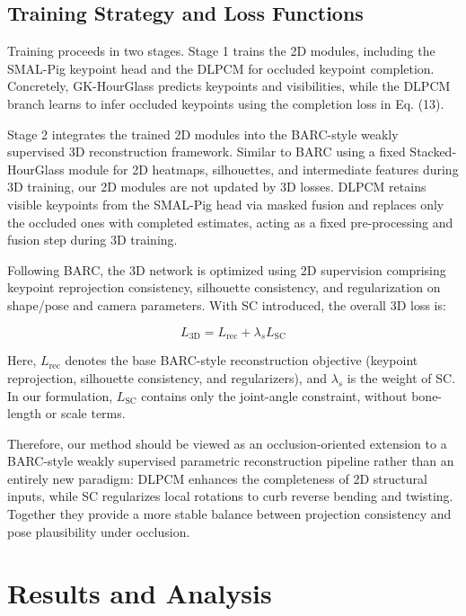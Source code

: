 \documentclass[computers,article,submit,pdftex,moreauthors]{mdpi}
\begin{document}
\subsection{Training Strategy and Loss Functions}\label{sec:training}

Training proceeds in two stages. Stage 1 trains the 2D modules, including the SMAL-Pig keypoint head and the DLPCM for occluded keypoint completion. Concretely, GK-HourGlass predicts keypoints and visibilities, while the DLPCM branch learns to infer occluded keypoints using the completion loss in Eq. (13).

Stage 2 integrates the trained 2D modules into the BARC-style weakly supervised 3D reconstruction framework. Similar to BARC using a fixed Stacked-HourGlass module for 2D heatmaps, silhouettes, and intermediate features during 3D training, our 2D modules are not updated by 3D losses. DLPCM retains visible keypoints from the SMAL-Pig head via masked fusion and replaces only the occluded ones with completed estimates, acting as a fixed pre-processing and fusion step during 3D training.

Following BARC, the 3D network is optimized using 2D supervision comprising keypoint reprojection consistency, silhouette consistency, and regularization on shape/pose and camera parameters. With SC introduced, the overall 3D loss is:

\begin{equation}
L_{\text{3D}} = L_{\text{rec}} + \lambda_s L_{\text{SC}}
\end{equation}

Here, $L_{\text{rec}}$ denotes the base BARC-style reconstruction objective (keypoint reprojection, silhouette consistency, and regularizers), and $\lambda_s$ is the weight of SC. In our formulation, $L_{\text{SC}}$ contains only the joint-angle constraint, without bone-length or scale terms.

Therefore, our method should be viewed as an occlusion-oriented extension to a BARC-style weakly supervised parametric reconstruction pipeline rather than an entirely new paradigm: DLPCM enhances the completeness of 2D structural inputs, while SC regularizes local rotations to curb reverse bending and twisting. Together they provide a more stable balance between projection consistency and pose plausibility under occlusion.

\section{Results and Analysis}\label{sec:results}
\end{document}
